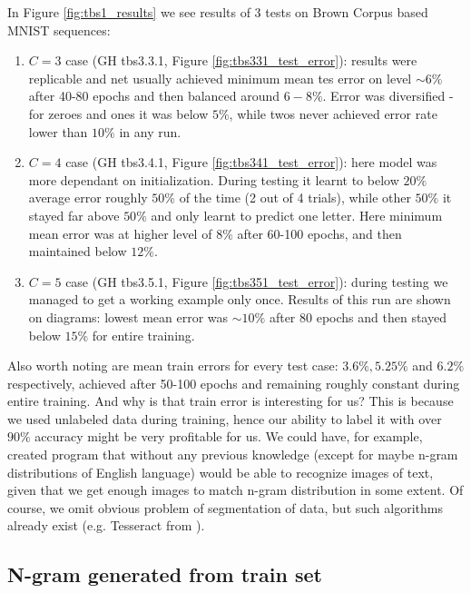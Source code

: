 \documentclass[declaration,shortabstract,lic,english]{iithesis}
\begin{document}
In Figure \ref{fig:tbs1_results} we see results of 3 tests on Brown Corpus based MNIST sequences:
\begin{enumerate}
\item $C=3$ case (GH tbs3.3.1, Figure \ref{fig:tbs331_test_error}): results were replicable and net usually achieved minimum mean tes error on level $\sim6\%$ after 40-80 epochs and then balanced around $6-8\%$. Error was diversified - for zeroes and ones it was below $5\%$, while twos never achieved error rate lower than $10\%$ in any run.
\item $C=4$ case (GH tbs3.4.1, Figure \ref{fig:tbs341_test_error}): here model was more dependant on initialization. During testing it learnt to below $20\%$ average error roughly $50\%$ of the time (2 out of 4 trials), while other $50\%$ it stayed far above $50\%$ and only learnt to predict one letter. Here minimum mean error was at higher level of $8\%$ after 60-100 epochs, and then maintained below $12\%$.
\item $C=5$ case (GH tbs3.5.1, Figure \ref{fig:tbs351_test_error}): during testing we managed to get a working example only once. Results of this run are shown on diagrams: lowest mean error was $\sim 10\%$ after 80 epochs and then stayed below $15\%$ for entire training.
\end{enumerate}

Also worth noting are mean train errors for every test case: $3.6\%, 5.25\%$ and $6.2\%$ respectively, achieved after 50-100 epochs and remaining roughly constant during entire training. And why is that train error is interesting for us? This is because we used unlabeled data during training, hence our ability to label it with over $90\%$ accuracy might be very profitable for us. We could have, for example, created program that without any previous knowledge (except for maybe n-gram distributions of English language) would be able to recognize images of text, given that we get enough images to match n-gram distribution in some extent. Of course, we omit obvious problem of segmentation of data, but such algorithms already exist (e.g. Tesseract from \citet{kay2007tesseract}).

\subsection{N-gram generated from train set}
\end{document}
